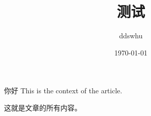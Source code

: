 \documentclass[UTF8]{ctexbook}
\title{测试}
\author{ddswhu}
\date{\today}
\begin{document}
\maketitle
{\kaishu 你好}
This is the context of the article.

这就是文章的所有内容。
 
\end{document}
